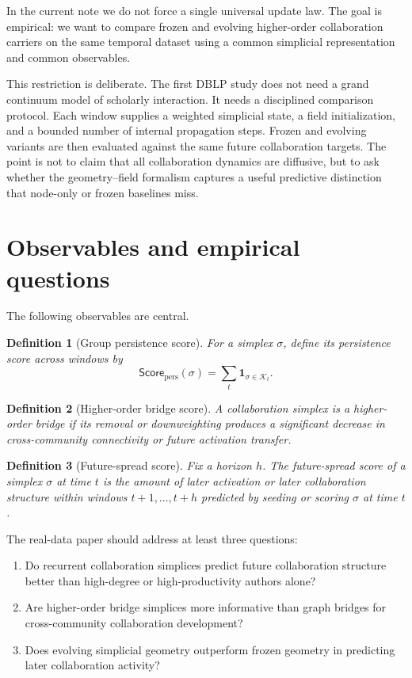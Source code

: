 \documentclass[11pt]{article}
\newtheorem{definition}{Definition}[section]
\newcommand{\K}{\mathcal{K}}
\newcommand{\score}{\mathsf{Score}}
\begin{document}
In the current note we do not force a single universal update law. The goal is empirical: we want to compare frozen and evolving higher-order collaboration carriers on the same temporal dataset using a common simplicial representation and common observables.

This restriction is deliberate. The first DBLP study does not need a grand continuum model of scholarly interaction. It needs a disciplined comparison protocol. Each window supplies a weighted simplicial state, a field initialization, and a bounded number of internal propagation steps. Frozen and evolving variants are then evaluated against the same future collaboration targets. The point is not to claim that all collaboration dynamics are diffusive, but to ask whether the geometry--field formalism captures a useful predictive distinction that node-only or frozen baselines miss.

\section{Observables and empirical questions}
The following observables are central.

\begin{definition}[Group persistence score]
For a simplex $\sigma$, define its persistence score across windows by
\[
\score_{\mathrm{pers}}(\sigma)=\sum_t \mathbf{1}_{\sigma\in \K_t}.
\]
\end{definition}

\begin{definition}[Higher-order bridge score]
A collaboration simplex is a higher-order bridge if its removal or downweighting produces a significant decrease in cross-community connectivity or future activation transfer.
\end{definition}

\begin{definition}[Future-spread score]
Fix a horizon $h$. The future-spread score of a simplex $\sigma$ at time $t$ is the amount of later activation or later collaboration structure within windows $t+1,\dots,t+h$ predicted by seeding or scoring $\sigma$ at time $t$.
\end{definition}

The real-data paper should address at least three questions:
\begin{enumerate}[label=(Q\arabic*)]
    \item Do recurrent collaboration simplices predict future collaboration structure better than high-degree or high-productivity authors alone?
    \item Are higher-order bridge simplices more informative than graph bridges for cross-community collaboration development?
    \item Does evolving simplicial geometry outperform frozen geometry in predicting later collaboration activity?
\end{enumerate}
\end{document}

